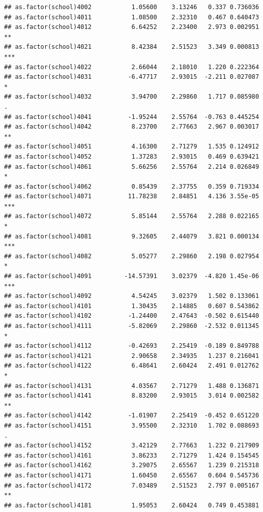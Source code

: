 \documentclass[ignorenonframetext,]{beamer}
\begin{document}
\begin{frame}[fragile]{}
\begin{verbatim}
## as.factor(school)4002           1.05600    3.13246   0.337 0.736036    
## as.factor(school)4011           1.08500    2.32310   0.467 0.640473    
## as.factor(school)4012           6.64252    2.23400   2.973 0.002951 ** 
## as.factor(school)4021           8.42384    2.51523   3.349 0.000813 ***
## as.factor(school)4022           2.66044    2.18010   1.220 0.222364    
## as.factor(school)4031          -6.47717    2.93015  -2.211 0.027087 *  
## as.factor(school)4032           3.94700    2.29860   1.717 0.085980 .  
## as.factor(school)4041          -1.95244    2.55764  -0.763 0.445254    
## as.factor(school)4042           8.23700    2.77663   2.967 0.003017 ** 
## as.factor(school)4051           4.16300    2.71279   1.535 0.124912    
## as.factor(school)4052           1.37283    2.93015   0.469 0.639421    
## as.factor(school)4061           5.66256    2.55764   2.214 0.026849 *  
## as.factor(school)4062           0.85439    2.37755   0.359 0.719334    
## as.factor(school)4071          11.78238    2.84851   4.136 3.55e-05 ***
## as.factor(school)4072           5.85144    2.55764   2.288 0.022165 *  
## as.factor(school)4081           9.32605    2.44079   3.821 0.000134 ***
## as.factor(school)4082           5.05277    2.29860   2.198 0.027954 *  
## as.factor(school)4091         -14.57391    3.02379  -4.820 1.45e-06 ***
## as.factor(school)4092           4.54245    3.02379   1.502 0.133061    
## as.factor(school)4101           1.30435    2.14885   0.607 0.543862    
## as.factor(school)4102          -1.24400    2.47643  -0.502 0.615440    
## as.factor(school)4111          -5.82069    2.29860  -2.532 0.011345 *  
## as.factor(school)4112          -0.42693    2.25419  -0.189 0.849788    
## as.factor(school)4121           2.90658    2.34935   1.237 0.216041    
## as.factor(school)4122           6.48641    2.60424   2.491 0.012762 *  
## as.factor(school)4131           4.03567    2.71279   1.488 0.136871    
## as.factor(school)4141           8.83200    2.93015   3.014 0.002582 ** 
## as.factor(school)4142          -1.01907    2.25419  -0.452 0.651220    
## as.factor(school)4151           3.95500    2.32310   1.702 0.088693 .  
## as.factor(school)4152           3.42129    2.77663   1.232 0.217909    
## as.factor(school)4161           3.86233    2.71279   1.424 0.154545    
## as.factor(school)4162           3.29075    2.65567   1.239 0.215318    
## as.factor(school)4171           1.60450    2.65567   0.604 0.545736    
## as.factor(school)4172           7.03489    2.51523   2.797 0.005167 ** 
## as.factor(school)4181           1.95053    2.60424   0.749 0.453881    

\end{verbatim}
\end{frame}
\end{document}
